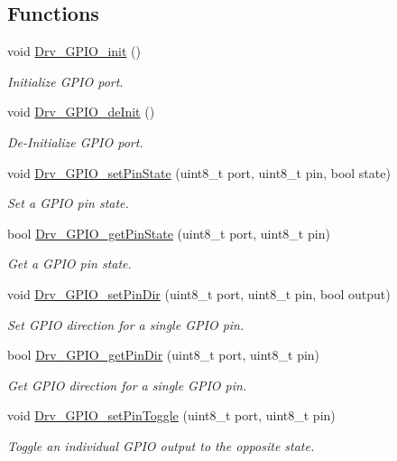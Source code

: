 \subsection*{Functions}
\begin{DoxyCompactItemize}
\item 
void \hyperlink{group___g_p_i_o___library_ga9be5db131ab65deac64ba3f32adc3e0a}{Drv\+\_\+\+G\+P\+I\+O\+\_\+init} ()
\begin{DoxyCompactList}\small\item\em Initialize G\+P\+I\+O port. \end{DoxyCompactList}\item 
void \hyperlink{group___g_p_i_o___library_gabfa3c7c5fbe5f6cc90ef6e78b2051c49}{Drv\+\_\+\+G\+P\+I\+O\+\_\+de\+Init} ()
\begin{DoxyCompactList}\small\item\em De-\/\+Initialize G\+P\+I\+O port. \end{DoxyCompactList}\item 
void \hyperlink{group___g_p_i_o___library_gaa0fc19aa74a1bf75817ba137e78f7a0a}{Drv\+\_\+\+G\+P\+I\+O\+\_\+set\+Pin\+State} (uint8\+\_\+t port, uint8\+\_\+t pin, bool state)
\begin{DoxyCompactList}\small\item\em Set a G\+P\+I\+O pin state. \end{DoxyCompactList}\item 
bool \hyperlink{group___g_p_i_o___library_ga3979c4c389440c603c44afef9b25c6c6}{Drv\+\_\+\+G\+P\+I\+O\+\_\+get\+Pin\+State} (uint8\+\_\+t port, uint8\+\_\+t pin)
\begin{DoxyCompactList}\small\item\em Get a G\+P\+I\+O pin state. \end{DoxyCompactList}\item 
void \hyperlink{group___g_p_i_o___library_gab513ddd38bb6f89dfa844fd7ab6c48dd}{Drv\+\_\+\+G\+P\+I\+O\+\_\+set\+Pin\+Dir} (uint8\+\_\+t port, uint8\+\_\+t pin, bool output)
\begin{DoxyCompactList}\small\item\em Set G\+P\+I\+O direction for a single G\+P\+I\+O pin. \end{DoxyCompactList}\item 
bool \hyperlink{group___g_p_i_o___library_gad767589a46bc6f6781d3572f68a71f1c}{Drv\+\_\+\+G\+P\+I\+O\+\_\+get\+Pin\+Dir} (uint8\+\_\+t port, uint8\+\_\+t pin)
\begin{DoxyCompactList}\small\item\em Get G\+P\+I\+O direction for a single G\+P\+I\+O pin. \end{DoxyCompactList}\item 
void \hyperlink{group___g_p_i_o___library_ga240d6ad540b4d4cc042ea7a3a5746159}{Drv\+\_\+\+G\+P\+I\+O\+\_\+set\+Pin\+Toggle} (uint8\+\_\+t port, uint8\+\_\+t pin)
\begin{DoxyCompactList}\small\item\em Toggle an individual G\+P\+I\+O output to the opposite state. \end{DoxyCompactList}\end{DoxyCompactItemize}



